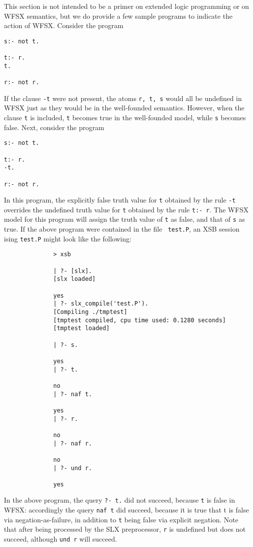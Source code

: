 This section is not intended to be a primer on extended logic
programming or on WFSX semantics, but we do provide a few sample
programs to indicate the action of WFSX.  Consider the program
{\small 
\begin{verbatim}
s:- not t.

t:- r.
t.

r:- not r.
\end{verbatim}
}
If the clause {\tt -t} were not present, the atoms {\tt r, t, s} would
all be undefined in WFSX just as they would be in the well-founded
semantics.  However, when the clause {\tt t} is included, {\tt t}
becomes true in the well-founded model, while {\tt s} becomes false.
Next, consider the program
{\small 
\begin{verbatim}
s:- not t.

t:- r.
-t.

r:- not r.
\end{verbatim}
}
In this program, the explicitly false truth value for {\tt t} obtained
by the rule {\tt -t} overrides the undefined truth value for {\tt t}
obtained by the rule {\tt t:- r}.  The WFSX model for this program
will assign the truth value of {\tt t} as false, and that of {\tt s}
as true.  If the above program were contained in the file {\tt
test.P}, an XSB session ising {\tt test.P} might look like the
following:
{\small
\begin{verbatim}
              > xsb
              
              | ?- [slx].
              [slx loaded]
            
              yes
              | ?- slx_compile('test.P').
              [Compiling ./tmptest]
              [tmptest compiled, cpu time used: 0.1280 seconds]
              [tmptest loaded]
            
              | ?- s.
              
              yes
              | ?- t.

              no
              | ?- naf t.
              
              yes
              | ?- r.

              no
              | ?- naf r.
              
              no
              | ?- und r.
              
              yes
\end{verbatim}
}
In the above program, the query {\tt ?- t.} did not succeed,  because
{\tt t} is false in WFSX: accordingly the query {\tt naf t} did
succeed, because it is true that t is false via negation-as-failure,
in addition to {\tt t} being false via explicit negation.  Note that
after being processed by the SLX preprocessor, {\tt r} is undefined
but does not succeed, although {\tt und r} will succeed.

